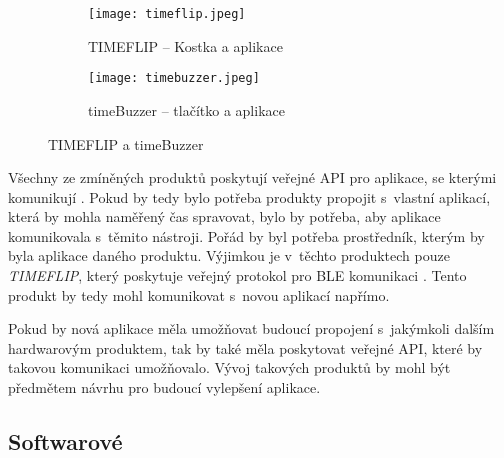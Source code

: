 \begin{figure}[h]
	\centering
	\begin{subfigure}[b]{5.2cm}
		\texttt{[image: timeflip.jpeg]}
		\caption{TIMEFLIP – Kostka a aplikace \cite{timeflip}}
		\label{pic:timeflip}
	\end{subfigure}
	\hspace{2cm}
	\begin{subfigure}[b]{7cm}
		\texttt{[image: timebuzzer.jpeg]}
		\caption{timeBuzzer – tlačítko a aplikace \cite{timebuzzer}}
		\label{pic:timebuzzer}
	\end{subfigure}
	\caption{TIMEFLIP a timeBuzzer}
\end{figure}

Všechny ze zmíněných produktů poskytují veřejné API pro aplikace, se kterými komunikují \cite{timeflip-api} \cite{timeular-api} \cite{timebuzzer-api}. Pokud by tedy bylo potřeba produkty propojit s~vlastní aplikací, která by mohla naměřený čas spravovat, bylo by potřeba, aby aplikace komunikovala s~těmito nástroji. Pořád by byl potřeba prostředník, kterým by byla aplikace daného produktu. Výjimkou je v~těchto produktech pouze \emph{TIMEFLIP}, který poskytuje veřejný protokol pro BLE komunikaci \cite{timeflip-ble-api}. Tento produkt by tedy mohl komunikovat s~novou aplikací napřímo.

Pokud by nová aplikace měla umožňovat budoucí propojení s~jakýmkoli dalším hardwarovým produktem, tak by také měla poskytovat veřejné API, které by takovou komunikaci umožňovalo. Vývoj takových produktů by mohl být předmětem návrhu pro budoucí vylepšení aplikace.

\subsection{Softwarové}\label{software-tracking-triggers}

